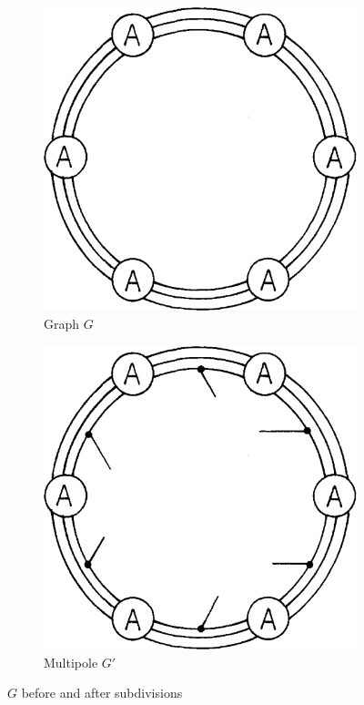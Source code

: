 \documentclass[12pt, twoside]{book}
\begin{document}
\begin{example}
	\begin{figure}
		\centering
		\begin{subfigure}[b]{0.4\textwidth}
			\centering
			\includegraphics[width=\textwidth]{images/Kochol-article/Kochol-before-subdivisions}
			\caption{Graph $G$}
			\label{fig:Kochol-before-subdivisions}
		\end{subfigure}
		\hfill
		\begin{subfigure}[b]{0.4\textwidth}
			\centering
			\includegraphics[width=\textwidth]{images/Kochol-article/Kochol-after-subdivisions}
			\caption{Multipole $G'$}
			\label{fig:Kochol-after-subdivisions}
		\end{subfigure}
		\caption{$G$ before and after subdivisions}
	\end{figure}
	

\end{example}
\end{document}

